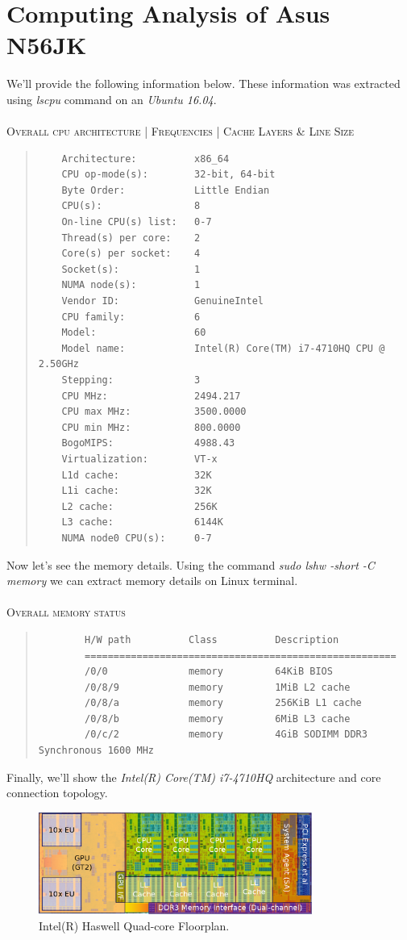 \documentclass[12pt]{article}
\numberwithin{equation}{section}
\numberwithin{table}{section}
\numberwithin{figure}{section}
\begin{document}
\section{Computing Analysis of Asus N56JK}
We'll provide the following information below. These information was extracted using \textit{lscpu} command on an \textit{Ubuntu 16.04}.\\
\\
\textsc{Overall cpu architecture | Frequencies | Cache Layers \& Line Size}
\begin{quote}
	\begin{verbatim}
	Architecture:          x86_64
	CPU op-mode(s):        32-bit, 64-bit
	Byte Order:            Little Endian
	CPU(s):                8
	On-line CPU(s) list:   0-7
	Thread(s) per core:    2
	Core(s) per socket:    4
	Socket(s):             1
	NUMA node(s):          1
	Vendor ID:             GenuineIntel
	CPU family:            6
	Model:                 60
	Model name:            Intel(R) Core(TM) i7-4710HQ CPU @ 2.50GHz
	Stepping:              3
	CPU MHz:               2494.217
	CPU max MHz:           3500.0000
	CPU min MHz:           800.0000
	BogoMIPS:              4988.43
	Virtualization:        VT-x
	L1d cache:             32K
	L1i cache:             32K
	L2 cache:              256K
	L3 cache:              6144K
	NUMA node0 CPU(s):     0-7
	\end{verbatim}
\end{quote}
Now let's see the memory details. Using the command \textit{sudo lshw -short -C memory} we can extract memory details on Linux terminal.\\
\\
\textsc{Overall memory status}
\begin{quote}
	\begin{verbatim}
		H/W path          Class          Description
		======================================================
		/0/0              memory         64KiB BIOS
		/0/8/9            memory         1MiB L2 cache
		/0/8/a            memory         256KiB L1 cache
		/0/8/b            memory         6MiB L3 cache
		/0/c/2            memory         4GiB SODIMM DDR3 Synchronous 1600 MHz
	\end{verbatim}
\end{quote}
\newpage
Finally, we'll show the \textit{Intel(R) Core(TM) i7-4710HQ} architecture and core connection topology.
\begin{figure}[!h]\centering
	\includegraphics[width=0.8\textwidth]{haswell.png}
	\caption{Intel(R) Haswell Quad-core Floorplan.}
	\label{figsolplot}
\end{figure}	
\end{document}
